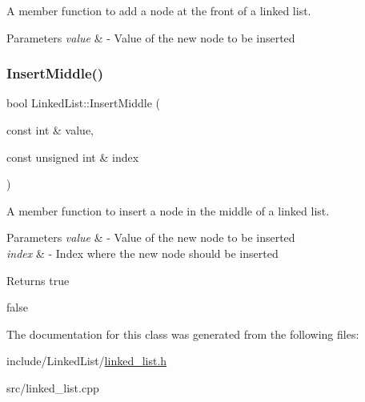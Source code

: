 A member function to add a node at the front of a linked list. 


\begin{DoxyParams}{Parameters}
{\em value} & -\/ Value of the new node to be inserted \\
\hline
\end{DoxyParams}
\mbox{\label{classLinkedList_ac9ec998fedd482a4f18ebf8c6a1204bd}} 
\subsubsection{\texorpdfstring{Insert\+Middle()}{InsertMiddle()}}
{\footnotesize\ttfamily bool Linked\+List\+::\+Insert\+Middle (\begin{DoxyParamCaption}\item[{const int \&}]{value,  }\item[{const unsigned int \&}]{index }\end{DoxyParamCaption})}



A member function to insert a node in the middle of a linked list. 


\begin{DoxyParams}{Parameters}
{\em value} & -\/ Value of the new node to be inserted \\
\hline
{\em index} & -\/ Index where the new node should be inserted \\
\hline
\end{DoxyParams}
\begin{DoxyReturn}{Returns}
true 

false 
\end{DoxyReturn}


The documentation for this class was generated from the following files\+:\begin{DoxyCompactItemize}
\item 
include/\+Linked\+List/\hyperlink{linked__list_8h}{linked\+\_\+list.\+h}\item 
src/linked\+\_\+list.\+cpp\end{DoxyCompactItemize}
